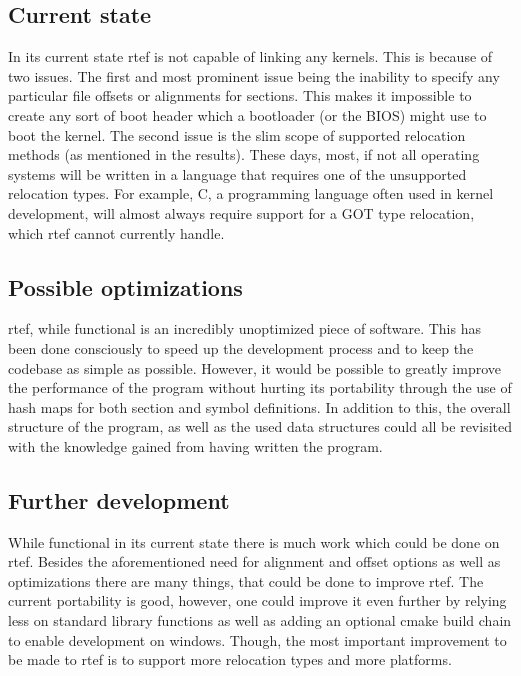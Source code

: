 \documentclass{article}
\begin{document}
\subsection{Current state}

In its current state rtef is not capable of linking any kernels. This is because of two issues. The first and most prominent issue being the inability to specify any particular file offsets or alignments for sections. This makes it impossible to create any sort of boot header which a bootloader (or the BIOS) might use to boot the kernel. The second issue is the slim scope of supported relocation methods (as mentioned in the results). These days, most, if not all operating systems will be written in a language that requires one of the unsupported relocation types. For example, C, a programming language often used in kernel development, will almost always require support for a GOT type relocation, which rtef cannot currently handle.

\subsection{Possible optimizations}

rtef, while functional is an incredibly unoptimized piece of software. This has been done consciously to speed up the development process and to keep the codebase as simple as possible. However, it would be possible to greatly improve the performance of the program without hurting its portability through the use of hash maps for both section and symbol definitions. In addition to this, the overall structure of the program, as well as the used data structures could all be revisited with the knowledge gained from having written the program.

\subsection{Further development}

While functional in its current state there is much work which could be done on rtef. Besides the aforementioned need for alignment and offset options as well as optimizations there are many things, that could be done to improve rtef. The current portability is good, however, one could improve it even further by relying less on standard library functions as well as adding an optional cmake build chain to enable development on windows. Though, the most important improvement to be made to rtef is to support more relocation types and more platforms.
\end{document}

